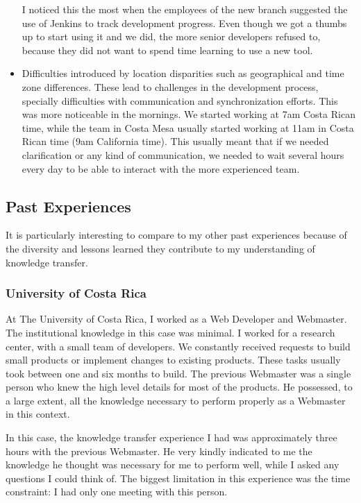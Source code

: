 \documentclass[12pt, letterpaper]{article}
\begin{document}
\begin{itemize}
  I noticed this the most when the employees of the new branch suggested the use of Jenkins to track 
  development progress. Even though we got a thumbs up to start using it and we did,
  the more senior developers refused to, because they did not want to spend time learning to use a new tool.
  \item Difficulties introduced by location disparities such as geographical and time zone differences. These lead to 
  challenges in the development process, specially difficulties with communication and synchronization efforts.
  This was more noticeable in the mornings. We started working at 7am Costa Rican time, while the team in Costa Mesa usually
  started working at 11am in Costa Rican time (9am California time). This usually meant that if we needed clarification
  or any kind of communication, we needed to wait several hours every day to be able to interact with the more experienced team.
  
\end{itemize}

\subsection{Past Experiences}
It is particularly interesting to compare to my other past experiences because of the diversity and lessons learned
they contribute to my understanding of knowledge transfer.

\subsubsection{University of Costa Rica}
At The University of Costa Rica, I worked as a Web Developer and Webmaster. 
The institutional knowledge in this case was minimal.
I worked for a research center, with a small team of developers. We constantly received requests to build small products 
or implement changes to existing products. These tasks usually took between one and six months to build.
The previous Webmaster was a single person who knew the high level details for most of the products. He possessed, 
to a large extent, all the knowledge necessary to perform properly as a Webmaster in this context.

In this case, the knowledge transfer experience I had was approximately three hours with the 
previous Webmaster. He very kindly
indicated to me the knowledge he thought was necessary for me to perform well, while I asked any questions I could 
think of. The biggest limitation in this experience was the time constraint: I had only one meeting with 
this person.
\end{document}
